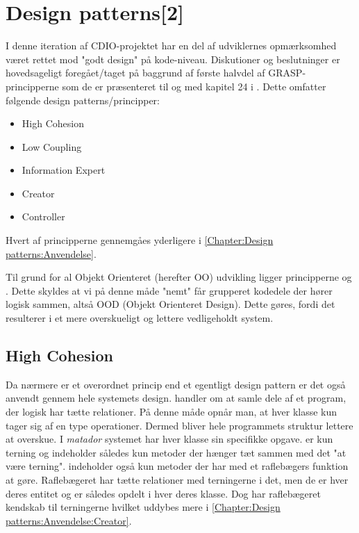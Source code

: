 \chapter{Design patterns[2]}\label{Chapter:Design patterns}
I denne iteration af CDIO-projektet \cite{CDIOdel2} har en del af udviklernes opmærksomhed været rettet mod "godt design" på kode-niveau. Diskutioner og beslutninger er hovedsageligt foregået/taget på baggrund af første halvdel af GRASP-principperne som de er præsenteret til og med kapitel 24 i \cite{umlbook}. Dette omfatter følgende design patterns/principper: 

\begin{itemize}
	\item High Cohesion    
	\item Low Coupling
	\item Information Expert
	\item Creator
	\item Controller
\end{itemize}





Hvert af principperne gennemgåes yderligere i \vref{Chapter:Design patterns:Anvendelse}.

Til grund for al Objekt Orienteret (herefter OO) udvikling ligger principperne  og . Dette skyldes at vi på denne måde "nemt" får grupperet kodedele der hører logisk sammen, altså OOD (Objekt Orienteret Design). Dette gøres, fordi det resulterer i et mere overskueligt og lettere vedligeholdt system.

\section{High Cohesion}\label{Chapter:Design patterns:Anvendelse:High Cohesion}
Da  nærmere er et overordnet princip end et egentligt design pattern er det også anvendt gennem hele systemets design.  handler om at samle dele af et program, der logisk har tætte relationer. På denne måde opnår man, at hver klasse kun tager sig af en type operationer. Dermed bliver hele programmets struktur lettere at overskue. I \textit{matador} systemet har hver klasse sin specifikke opgave.  er kun terning og indeholder således kun metoder der hænger tæt sammen med det "at være terning".  indeholder også kun metoder der har med et raflebægers funktion at gøre. Raflebægeret har tætte relationer med terningerne i det, men de er hver deres entitet og er således opdelt i hver deres klasse. Dog har raflebægeret kendskab til terningerne hvilket uddybes mere i \vref{Chapter:Design patterns:Anvendelse:Creator}.       

